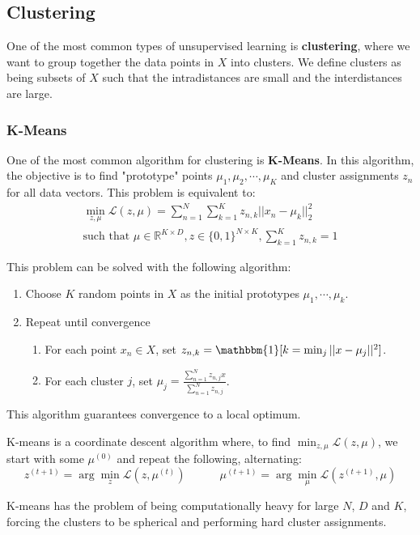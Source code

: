 \documentclass{article}
\newcommand{\R}{\mathbb{R}}
\newcommand{\ind}{\mathbbm{1}}
\newcommand{\loss}{\mathcal{L}}
\begin{document}
\subsection{Clustering}

One of the most common types of unsupervised learning is \textbf{clustering}, where we want to group together the data points in $X$ into clusters.
We define clusters as being subsets of $X$ such that the intradistances are small and the interdistances are large.

\subsubsection{K-Means}

One of the most common algorithm for clustering is \textbf{K-Means}.
In this algorithm, the objective is to find "prototype" points $\mu_1, \mu_2, \cdots, \mu_K$ and cluster assignments $z_n$ for all data vectors.
This problem is equivalent to:
\begin{gather*}
\min_{z, \mu} \loss(z, \mu) = \sum_{n=1}^N \sum_{k=1}^K z_{n,k} ||x_n - \mu_k||_2^2 \\
\text{such that } \mu \in \R^{K \times D}, z \in \{0,1\}^{N \times K}, \sum_{k=1}^K z_{n,k} = 1 
\end{gather*}

This problem can be solved with the following algorithm:
\begin{enumerate}
    \item Choose $K$ random points in $X$ as the initial prototypes $\mu_1, \cdots, \mu_k$.
    \item Repeat until convergence
    \begin{enumerate}
	\item For each point $x_n \in X$, set $z_{n,k} = \ind [k = \min_j ||x-\mu_j||^2]$.
	\item For each cluster $j$, set $\mu_j = \frac{\sum_{n=1}^N z_{n,j} x}{\sum_{n=1}^N z_{n,j}}$.
    \end{enumerate}
\end{enumerate}

This algorithm guarantees convergence to a local optimum.

K-means is a coordinate descent algorithm where, to find $\min_{z, \mu} \loss(z, \mu)$, we start with some $\mu^{(0)}$ and repeat the following, alternating:
$$
z^{(t+1)} = \arg \min_z \loss(z, \mu^{(t)}) \quad \quad \quad
\mu^{(t+1)} = \arg \min_\mu \loss(z^{(t+1)}, \mu)
$$

K-means has the problem of being computationally heavy for large $N$, $D$ and $K$, forcing the clusters to be spherical and performing hard cluster assignments.
\end{document}
